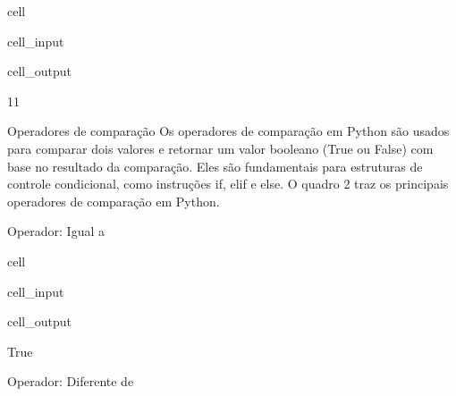 \documentclass[letterpaper,10pt,english]{jupyterBook}
\begin{document}
\begin{sphinxuseclass}{cell}\begin{sphinxVerbatimInput}

\begin{sphinxuseclass}{cell_input}
\begin{sphinxVerbatim}[commandchars=\\\{\}]
      
        
\end{sphinxVerbatim}

\end{sphinxuseclass}\end{sphinxVerbatimInput}
\begin{sphinxVerbatimOutput}

\begin{sphinxuseclass}{cell_output}
\begin{sphinxVerbatim}[commandchars=\\\{\}]
11
\end{sphinxVerbatim}

\end{sphinxuseclass}\end{sphinxVerbatimOutput}

\end{sphinxuseclass}
\sphinxAtStartPar
Operadores de comparação
Os operadores de comparação em Python são usados para comparar dois valores e retornar um valor booleano (True ou False) com base no resultado da comparação. Eles são fundamentais para estruturas de controle condicional, como instruções if, elif e else. O quadro 2 traz os principais operadores de comparação em Python.

\sphinxAtStartPar
Operador: Igual a

\begin{sphinxuseclass}{cell}\begin{sphinxVerbatimInput}

\begin{sphinxuseclass}{cell_input}
\begin{sphinxVerbatim}[commandchars=\\\{\}]
\end{sphinxVerbatim}

\end{sphinxuseclass}\end{sphinxVerbatimInput}
\begin{sphinxVerbatimOutput}

\begin{sphinxuseclass}{cell_output}
\begin{sphinxVerbatim}[commandchars=\\\{\}]
True
\end{sphinxVerbatim}

\end{sphinxuseclass}\end{sphinxVerbatimOutput}

\end{sphinxuseclass}
\sphinxAtStartPar
Operador: Diferente de
\end{document}

